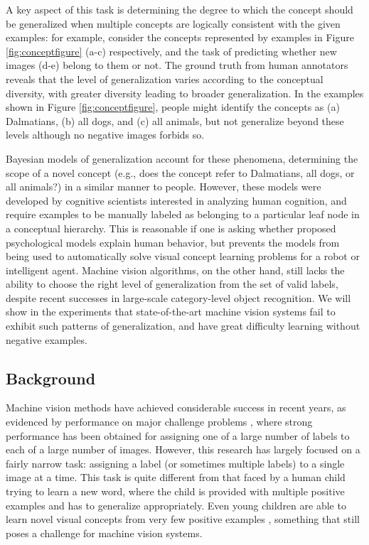 A key aspect of this task is determining the degree to which the concept should be generalized \cite{xu2007word} when multiple concepts are logically consistent with the given examples: for example, consider the concepts represented by examples in Figure \ref{fig:conceptfigure} (a-c) respectively, and the task of predicting whether new images (d-e) belong to them or not.  The ground truth from human annotators reveals that the level of generalization varies according to the conceptual diversity, with greater diversity leading to broader generalization. In the examples shown in Figure \ref{fig:conceptfigure}, people might identify the concepts as (a) Dalmatians, (b) all dogs, and (c) all animals, but not generalize beyond these levels although no negative images forbids so.

Bayesian models of generalization \cite{abbottconstructing, tenenbaum99, xu2007word} account for these phenomena, determining the scope of a novel concept (e.g., does the concept refer to Dalmatians, all dogs, or all animals?) in a similar manner to people. However, these models were developed by cognitive scientists interested in analyzing human cognition, and require examples to be manually labeled as belonging to a particular leaf node in a conceptual hierarchy. This is reasonable if one is asking whether proposed psychological models explain human behavior, but prevents the models from being used to automatically solve visual concept learning problems for a robot or intelligent agent. Machine vision algorithms, on the other hand, still lacks the ability to choose the right level of generalization from the set of valid labels, despite recent successes in large-scale category-level object recognition. We will show in the experiments that state-of-the-art machine vision systems fail to exhibit such patterns of generalization, and have great difficulty learning without negative examples.

\subsection{Background}

Machine vision methods have achieved considerable success in recent years, as evidenced by performance on major challenge problems \cite{imagenet,pascal}, where strong performance has been obtained for assigning one of a large number of labels to each of a large number of images. However, this research has largely focused on a fairly narrow task: assigning a label (or sometimes multiple labels) to a single image at a time. This task is quite different from that faced by a human child trying to learn a new word, where the child is provided with multiple positive examples and has to generalize appropriately. Even young children are able to learn novel visual concepts from very few positive examples \cite{carey1978}, something that still poses a challenge for machine vision systems.


